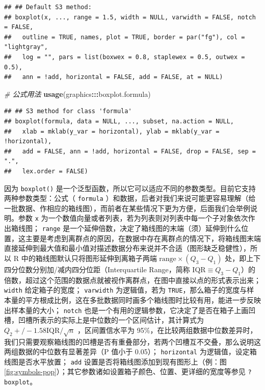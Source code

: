 \documentclass[
  b5paper,
  UTF8,twoside]{book}
\newenvironment{Shaded}{\begin{snugshade}}{\end{snugshade}}
\newcommand{\CommentTok}[1]{\textcolor[rgb]{0.56,0.35,0.01}{\textit{#1}}}
\newcommand{\FunctionTok}[1]{\textcolor[rgb]{0.13,0.29,0.53}{\textbf{#1}}}
\newcommand{\NormalTok}[1]{#1}
\newcommand{\SpecialCharTok}[1]{\textcolor[rgb]{0.81,0.36,0.00}{\textbf{#1}}}
\begin{document}
\begin{verbatim}
## ## Default S3 method:
## boxplot(x, ..., range = 1.5, width = NULL, varwidth = FALSE, notch = FALSE,
##   outline = TRUE, names, plot = TRUE, border = par("fg"), col = "lightgray",
##   log = "", pars = list(boxwex = 0.8, staplewex = 0.5, outwex = 0.5),
##   ann = !add, horizontal = FALSE, add = FALSE, at = NULL)
\end{verbatim}

\begin{Shaded}
\begin{Highlighting}[]
\CommentTok{\# 公式用法}
\FunctionTok{usage}\NormalTok{(graphics}\SpecialCharTok{:::}\NormalTok{boxplot.formula)}
\end{Highlighting}
\end{Shaded}

\begin{verbatim}
## ## S3 method for class 'formula'
## boxplot(formula, data = NULL, ..., subset, na.action = NULL,
##   xlab = mklab(y_var = horizontal), ylab = mklab(y_var = !horizontal),
##   add = FALSE, ann = !add, horizontal = FALSE, drop = FALSE, sep = ".",
##   lex.order = FALSE)
\end{verbatim}

因为 \texttt{boxplot()} 是一个泛型函数，所以它可以适应不同的参数类型。目前它支持两种参数类型：公式（ \texttt{formula} ）和数据，后者对我们来说可能更容易理解（给一批数据、作相应的箱线图），而前者在某些情况下更为方便，后面我们会举例说明。参数 \texttt{x} 为一个数值向量或者列表，若为列表则对列表中每一个子对象依次作出箱线图； \texttt{range} 是一个延伸倍数，决定了箱线图的末端（须）延伸到什么位置，这主要是考虑到离群点的原因，在数据中存在离群点的情况下，将箱线图末端直接延伸到最大值和最小值对描述数据分布来说并不合适（图形缺乏稳健性），所以 R 中的箱线图默认只将图形延伸到离箱子两端 \(\mathrm{range}\times(Q_3-Q_1)\) 处，即上下四分位数分别加/减内四分位距（Interquartile
Range，简称 \(\text{IQR}\equiv Q_3-Q_1\)）的倍数，超过这个范围的数据点就被视作离群点，在图中直接以点的形式表示出来； \texttt{width} 给定箱子的宽度； \texttt{varwidth} 为逻辑值，若为 \texttt{TRUE}，那么箱子的宽度与样本量的平方根成比例，这在多批数据同时画多个箱线图时比较有用，能进一步反映出样本量的大小； \texttt{notch} 也是一个有用的逻辑参数，它决定了是否在箱子上画凹槽，凹槽所表示的实际上是中位数的一个区间估计，其计算式为 \(Q_2+/-1.58\mathrm{IQR}/\sqrt{n}\)
\citep{McGill78, Chambers83}，区间置信水平为 95\%，在比较两组数据中位数差异时，我们只需要观察箱线图的凹槽是否有重叠部分，若两个凹槽互不交叠，那么说明这两组数据的中位数有显著差异（P 值小于 0.05）； \texttt{horizontal} 为逻辑值，设定箱线图是否水平放置； \texttt{add} 设置是否将箱线图添加到现有图形上（例：图 \ref{fig:symbols-pop}）；其它参数诸如设置箱子颜色、位置、更详细的宽度等参见 \texttt{?boxplot}。
\end{document}
